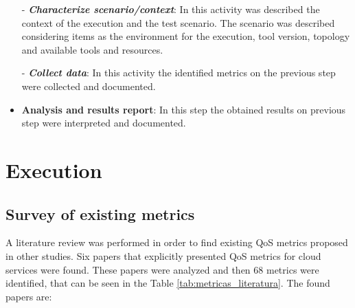 \documentclass[conference]{IEEEtran}
\begin{document}
\begin{itemize}

  \subitem - \emph{\textbf{Characterize scenario/context}}: In this activity was described the context of the execution and the test scenario. The scenario was described considering items as the environment for
  the execution, tool version, topology and available tools and resources.

  \subitem - \emph{\textbf{Collect data}}: In this activity the identified metrics on 
  the previous step were collected and documented.

 \item \textbf{Analysis and results report}: In this step the obtained results on previous step were
 interpreted and documented.
 
\end{itemize}

\section{Execution} %

  \subsection{Survey of existing metrics}
     
      
      A literature review was performed in order to find existing QoS metrics proposed in other studies.
      Six papers that explicitly presented QoS metrics for cloud services were found. These papers were analyzed and then 
      68 metrics were identified, that can be seen in the Table \ref{tab:metricas_literatura}. The found papers are:
      
\end{document}
